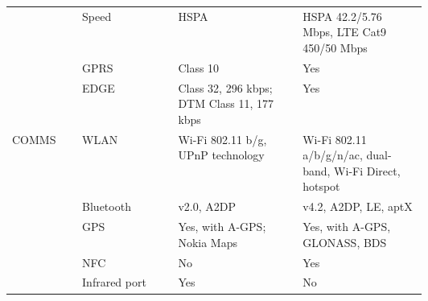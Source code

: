 \begin{longtable}{llp{0.3\linewidth}p{0.3\linewidth}}
         & Speed         & HSPA                                                         & HSPA 42.2/5.76 Mbps, LTE Cat9 450/50 Mbps                                                                                                                                                                   \\
         & GPRS          & Class 10                                                     & Yes                                                                                                                                                                                                         \\
         & EDGE          & Class 32, 296 kbps; DTM Class 11, 177 kbps                   & Yes                                                                                                                                                                                                         \\ \hline
COMMS    & WLAN          & Wi-Fi 802.11 b/g, UPnP technology                            & Wi-Fi 802.11 a/b/g/n/ac, dual-band, Wi-Fi Direct, hotspot                                                                                                                                                   \\
         & Bluetooth     & v2.0, A2DP                                                   & v4.2, A2DP, LE, aptX                                                                                                                                                                                        \\
         & GPS           & Yes, with A-GPS; Nokia Maps                                  & Yes, with A-GPS, GLONASS, BDS                                                                                                                                                                               \\
         & NFC           & No                                                           & Yes                                                                                                                                                                                                         \\
         & Infrared port & Yes                                                          & No                                                                                                                                                                                                          \\

\end{longtable}

